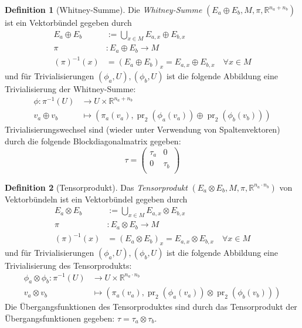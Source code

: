 \documentclass[a4paper]{scrreprt}
\numberwithin{equation}{chapter}
\DeclareMathOperator{\pr}{pr}
\newcommand{\R}{\mathbb{R}}
\theoremstyle{definition}
\newtheorem{defn}{Definition}[section]
\begin{document}
		\begin{defn}[Whitney-Summe]
			Die \emph{Whitney-Summe} $(E_a\oplus E_b ,M,\pi,\R^{n_a+n_b})$ ist ein Vektorbündel gegeben durch
			\begin{align*}
				E_a\oplus E_b&:=\bigcup_{x\in M}E_{a,x}\oplus E_{b,x}\\
				\pi&\colon E_a\oplus E_b\rightarrow M\\
				(\pi)^{-1}(x)&=(E_a\oplus E_b)_x=E_{a,x}\oplus E_{b,x}\quad \forall x\in M
			\end{align*}
			und für Trivialisierungen $(\phi_a,U),(\phi_b,U)$ ist die folgende Abbildung eine Trivialisierung der Whitney-Summe:
			\begin{align*}
				\phi\colon\pi^{-1}(U)&\rightarrow U\times \R^{n_a+n_b}\\
				v_a\oplus v_b&\mapsto (\pi_a(v_a), \pr_2(\phi_a(v_a))\oplus\pr_2(\phi_b(v_b)))
			\end{align*}
			Trivialisierungswechsel sind (wieder unter Verwendung von Spaltenvektoren) durch die folgende Blockdiagonalmatrix gegeben: 
			\begin{equation}
				\tau=\left(\begin{array}{cc}\tau_a&0\\0&\tau_b\\ \end{array}\right)
			\end{equation}
		\end{defn}
		\begin{defn}[Tensorprodukt]
			Das \emph{Tensorprodukt} $(E_a\otimes E_b ,M,\pi,\R^{n_a\cdot n_b})$ von Vektorbündeln ist ein Vektorbündel gegeben durch
			\begin{align*}
				E_a\otimes E_b&:=\bigcup_{x\in M}E_{a,x}\otimes E_{b,x}\\
				\pi&\colon E_a\otimes E_b\rightarrow M\\
				(\pi)^{-1}(x)&=(E_a\otimes E_b)_x=E_{a,x}\otimes E_{b,x}\quad \forall x\in M
			\end{align*}
			und für Trivialisierungen $(\phi_a,U),(\phi_b,U)$ ist die folgende Abbildung eine Trivialisierung des Tensorprodukts:
			\begin{align*}
				\phi_a\otimes\phi_b\colon\pi^{-1}(U)&\rightarrow U\times \R^{n_a\cdot n_b}\\
				v_a\otimes v_b&\mapsto (\pi_a(v_a), \pr_2(\phi_a(v_a))\otimes\pr_2(\phi_b(v_b)))
			\end{align*}
			Die Übergangsfunktionen des Tensorproduktes sind durch das Tensorprodukt der Übergangsfunktionen gegeben: $\tau=\tau_a\otimes\tau_b$.
		\end{defn}
\end{document}

